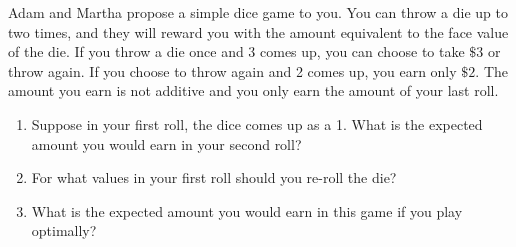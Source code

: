  Adam and Martha propose a simple dice game to you. You can throw a die up to two times, and they will reward you with the amount equivalent to the face value of the die. If you throw a die once and 3 comes up, you can choose to take $\$3$ or throw again. If you choose to throw again and 2 comes up, you earn only $\$2$. The amount you earn is not additive and you only earn the amount of your last roll. 
        
\begin{enumerate}[label=(\alph*)]
        \item Suppose in your first roll, the dice comes up as a 1.  What is the expected amount you would earn in your second roll?
        \item For what values in your first roll should you re-roll the die?
        \item What is the expected amount you would earn in this game if you play optimally?
\end{enumerate}

\bigspace        
        


                          
